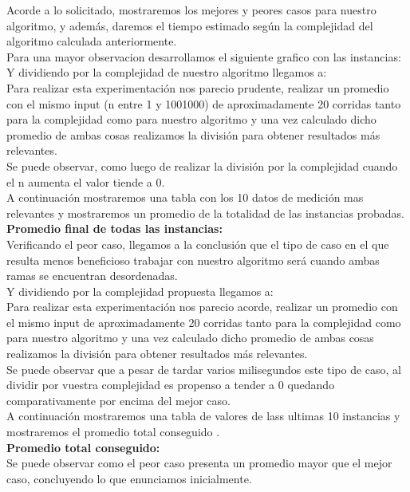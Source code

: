 \indent Acorde a lo solicitado, mostraremos los mejores y peores casos para nuestro algoritmo, y adem\'as, daremos el tiempo estimado 
seg\'un la complejidad del algoritmo calculada anteriormente.\\


Para una mayor observacion desarrollamos el siguiente grafico con las instancias:\\
  
Y dividiendo por la complejidad de nuestro algoritmo llegamos a:\\

Para realizar esta experimentaci\'on nos parecio prudente, realizar un promedio con el mismo input (n entre 1 y 1001000) de aproximadamente 20 corridas
tanto para la complejidad como para nuestro algoritmo y una vez calculado dicho promedio de ambas cosas realizamos la divisi\'on para
obtener resultados m\'as relevantes.\\ 

Se puede observar, como luego de realizar la divisi\'on por la complejidad cuando el n aumenta el valor tiende a 0.\\

A continuaci\'on mostraremos una tabla  con los 10 datos de medici\'on mas relevantes  y mostraremos un promedio de la totalidad de las instancias probadas.\\

\textbf{Promedio final de todas las instancias:}\\

Verificando el peor caso, llegamos a la conclusi\'on que el tipo de caso en el que resulta menos beneficioso trabajar con nuestro algoritmo ser\'a cuando
ambas ramas se encuentran desordenadas.
\\

Y dividiendo por la complejidad propuesta llegamos a:\\
Para realizar esta experimentaci\'on nos parecio acorde, realizar un promedio con el mismo input de aproximadamente 20 corridas
tanto para la complejidad como para nuestro algoritmo y una vez calculado dicho promedio de ambas cosas realizamos la divisi\'on para
obtener resultados m\'as relevantes.\\ 

Se puede observar que a pesar de tardar varios milisegundos este tipo de caso, al dividir por vuestra complejidad
es propenso a tender a 0 quedando comparativamente por encima del mejor caso.\\

A continuaci\'on mostraremos una tabla de valores de lass ultimas 10 instancias y
mostraremos el promedio total conseguido .\\


\textbf{Promedio total conseguido: }\\

Se puede observar como el peor caso presenta un promedio mayor que el mejor caso, concluyendo lo que enunciamos inicialmente.\\
